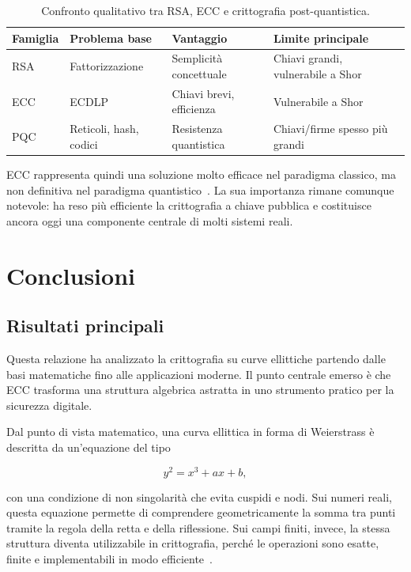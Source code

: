 \documentclass[12pt,a4paper,oneside]{report}
\begin{document}
\begin{table}[h]
\centering
\begin{tabular}{llll}
\toprule
\textbf{Famiglia} & \textbf{Problema base} & \textbf{Vantaggio} & \textbf{Limite principale} \\
\midrule
RSA & Fattorizzazione & Semplicità concettuale & Chiavi grandi, vulnerabile a Shor \\
ECC & ECDLP & Chiavi brevi, efficienza & Vulnerabile a Shor \\
PQC & Reticoli, hash, codici & Resistenza quantistica & Chiavi/firme spesso più grandi \\
\bottomrule
\end{tabular}
\caption{Confronto qualitativo tra RSA, ECC e crittografia post-quantistica.}
\label{tab:rsa-ecc-pqc}
\end{table}

ECC rappresenta quindi una soluzione molto efficace nel paradigma classico, ma non definitiva nel paradigma quantistico~\cite{margara_ec,margara_pqc}. La sua importanza rimane comunque notevole: ha reso più efficiente la crittografia a chiave pubblica e costituisce ancora oggi una componente centrale di molti sistemi reali.

\chapter{Conclusioni}

\section{Risultati principali}

Questa relazione ha analizzato la crittografia su curve ellittiche partendo dalle basi matematiche fino alle applicazioni moderne. Il punto centrale emerso è che ECC trasforma una struttura algebrica astratta in uno strumento pratico per la sicurezza digitale.

Dal punto di vista matematico, una curva ellittica in forma di Weierstrass è descritta da un'equazione del tipo

\[
y^2 = x^3 + ax + b,
\]

con una condizione di non singolarità che evita cuspidi e nodi. Sui numeri reali, questa equazione permette di comprendere geometricamente la somma tra punti tramite la regola della retta e della riflessione. Sui campi finiti, invece, la stessa struttura diventa utilizzabile in crittografia, perché le operazioni sono esatte, finite e implementabili in modo efficiente~\cite{margara_ec,sec1}.
\end{document}
